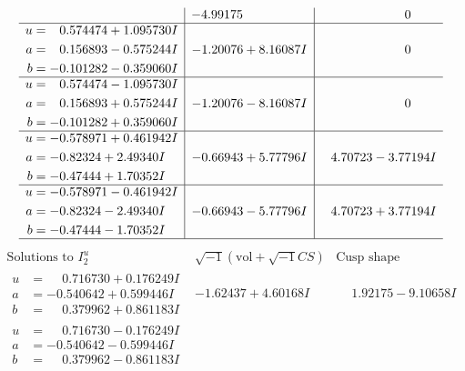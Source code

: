 \documentclass[1p]{elsarticle_modified}
\theoremstyle{definition}
\newcommand{\I}{\sqrt{-1}}
\begin{document}
$$\begin{array}{c|c|c}
 & -4.99175\phantom{ +0.000000I} & \phantom{-0.000000 } 0 \\ \hline\begin{aligned}
u &= \phantom{-}0.574474 + 1.095730 I \\
a &= \phantom{-}0.156893 - 0.575244 I \\
b &= -0.101282 - 0.359060 I\end{aligned}
 & -1.20076 + 8.16087 I & \phantom{-0.000000 } 0 \\ \hline\begin{aligned}
u &= \phantom{-}0.574474 - 1.095730 I \\
a &= \phantom{-}0.156893 + 0.575244 I \\
b &= -0.101282 + 0.359060 I\end{aligned}
 & -1.20076 - 8.16087 I & \phantom{-0.000000 } 0 \\ \hline\begin{aligned}
u &= -0.578971 + 0.461942 I \\
a &= -0.82324 + 2.49340 I \\
b &= -0.47444 + 1.70352 I\end{aligned}
 & -0.66943 + 5.77796 I & \phantom{-}4.70723 - 3.77194 I \\ \hline\begin{aligned}
u &= -0.578971 - 0.461942 I \\
a &= -0.82324 - 2.49340 I \\
b &= -0.47444 - 1.70352 I\end{aligned}
 & -0.66943 - 5.77796 I & \phantom{-}4.70723 + 3.77194 I\\
 \hline 
 \end{array}$$\newpage$$\begin{array}{c|c|c}  
\text{Solutions to }I^u_{2}& \I (\text{vol} + \sqrt{-1}CS) & \text{Cusp shape}\\
 \hline 
\begin{aligned}
u &= \phantom{-}0.716730 + 0.176249 I \\
a &= -0.540642 + 0.599446 I \\
b &= \phantom{-}0.379962 + 0.861183 I\end{aligned}
 & -1.62437 + 4.60168 I & \phantom{-}1.92175 - 9.10658 I \\ \hline\begin{aligned}
u &= \phantom{-}0.716730 - 0.176249 I \\
a &= -0.540642 - 0.599446 I \\
b &= \phantom{-}0.379962 - 0.861183 I\end{aligned}

\end{array}$$
\end{document}
